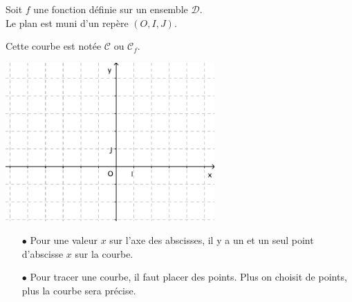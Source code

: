 Soit $f$ une fonction définie sur un ensemble $\mathscr{D}$. \\
Le plan est muni d'un repère $(O,I,J)$.

\begin{definition}
\end{definition}

Cette courbe est notée $\mathscr{C}$ ou $\mathscr{C}_f$.\\

{\centering 
  \includegraphics[width=8cm]{F_Axes.pdf}    
\par}

\begin{definition}
\end{definition}

\begin{itemize}
\item[$\bullet$] Pour une valeur $x$ sur l'axe des abscisses, il y a un et un
  seul point d'abscisse $x$ sur la courbe.
\item[$\bullet$] Pour tracer une courbe, il faut placer des points. Plus on
  choisit de points, plus la courbe sera précise.
\end{itemize}

